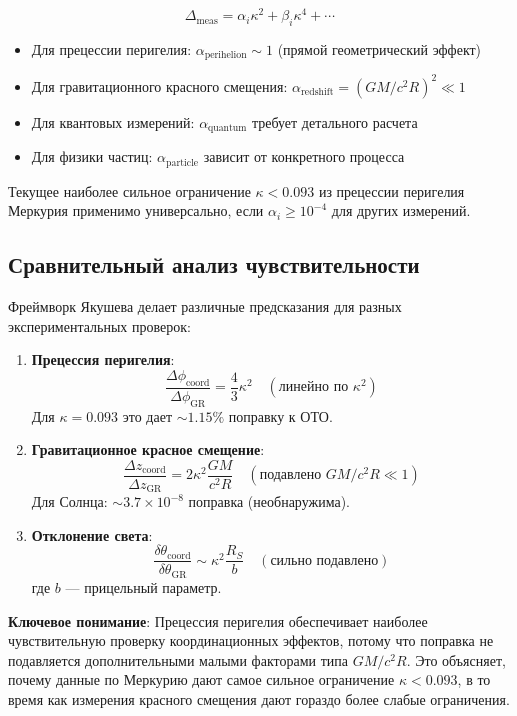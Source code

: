 \documentclass[11pt,a4paper]{article}
\begin{document}
	\begin{equation}
		\Delta_{\text{meas}} = \alpha_i \kappa^2 + \beta_i \kappa^4 + \cdots
	\end{equation}
	
	\begin{itemize}
		\item Для прецессии перигелия: $\alpha_{\text{perihelion}} \sim 1$ (прямой геометрический эффект)
		\item Для гравитационного красного смещения: $\alpha_{\text{redshift}} = (GM/c^2R)^2 \ll 1$
		\item Для квантовых измерений: $\alpha_{\text{quantum}}$ требует детального расчета
		\item Для физики частиц: $\alpha_{\text{particle}}$ зависит от конкретного процесса
	\end{itemize}
	
	Текущее наиболее сильное ограничение $\kappa < 0.093$ из прецессии перигелия Меркурия применимо универсально, если $\alpha_i \geq 10^{-4}$ для других измерений.
	
	\subsection{Сравнительный анализ чувствительности}
	\label{subsec:comparative-sensitivity}
	
	Фреймворк Якушева делает различные предсказания для разных экспериментальных проверок:
	
	\begin{enumerate}
		\item \textbf{Прецессия перигелия}: 
		\[
		\frac{\Delta\phi_{\text{coord}}}{\Delta\phi_{\text{GR}}} = \frac{4}{3}\kappa^2 \quad (\text{линейно по }\kappa^2)
		\]
		Для $\kappa = 0.093$ это дает $\sim 1.15\%$ поправку к ОТО.
		
		\item \textbf{Гравитационное красное смещение}:
		\[
		\frac{\Delta z_{\text{coord}}}{\Delta z_{\text{GR}}} = 2\kappa^2 \frac{GM}{c^2R} \quad (\text{подавлено }GM/c^2R \ll 1)
		\]
		Для Солнца: $\sim 3.7\times10^{-8}$ поправка (необнаружима).
		
		\item \textbf{Отклонение света}:
		\[
		\frac{\delta\theta_{\text{coord}}}{\delta\theta_{\text{GR}}} \sim \kappa^2 \frac{R_S}{b} \quad (\text{сильно подавлено})
		\]
		где $b$ — прицельный параметр.
	\end{enumerate}
	
	\textbf{Ключевое понимание}: Прецессия перигелия обеспечивает наиболее чувствительную проверку координационных эффектов, потому что поправка не подавляется дополнительными малыми факторами типа $GM/c^2R$. Это объясняет, почему данные по Меркурию дают самое сильное ограничение $\kappa < 0.093$, в то время как измерения красного смещения дают гораздо более слабые ограничения.
	
\end{document}

